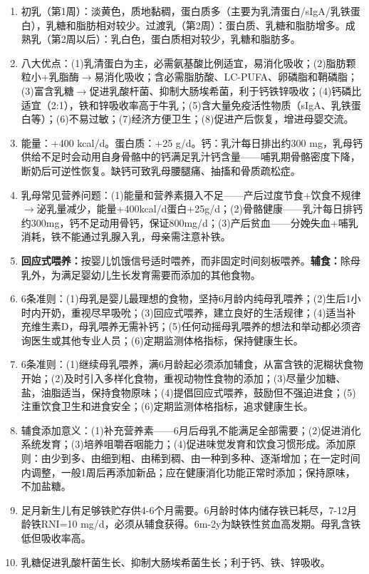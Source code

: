 {\begin{enumerate}[leftmargin=*, itemsep=5pt]
    \item 初乳（第1周）：淡黄色，质地黏稠，蛋白质多（主要为乳清蛋白/sIgA/乳铁蛋白），乳糖和脂肪相对较少。过渡乳（第2周）：蛋白质、乳糖和脂肪增多。成熟乳（第2周以后）：乳白色，蛋白质相对较少，乳糖和脂肪多。
    \item 八大优点：(1)乳清蛋白为主，必需氨基酸比例适宜，易消化吸收；(2)脂肪颗粒小+乳脂酶$\rightarrow$易消化吸收；含必需脂肪酸、LC-PUFA、卵磷脂和鞘磷脂；(3)富含乳糖$\rightarrow$促进乳酸杆菌、抑制大肠埃希菌，利于钙铁锌吸收；(4)钙磷比适宜（2:1），铁和锌吸收率高于牛乳；(5)含大量免疫活性物质（sIgA、乳铁蛋白等）；(6)不易过敏；(7)经济方便卫生；(8)促进产后恢复，增进母婴交流。
    \item 能量：+400 kcal/d。蛋白质：+25 g/d。钙：乳汁每日排出约300 mg，乳母钙供给不足时会动用自身骨骼中的钙满足乳汁钙含量——哺乳期骨骼密度下降，断奶后可逆性恢复。缺钙可致乳母腰腿痛、抽搐和骨质疏松症。
    \item 乳母常见营养问题：(1)能量和营养素摄入不足——产后过度节食+饮食不规律$\rightarrow$泌乳量减少，能量+400kcal/d蛋白+25g/d；(2)骨骼健康——乳汁每日排钙约300mg，钙不足动用骨钙，保证800mg/d；(3)产后贫血——分娩失血+哺乳消耗，铁不能通过乳腺入乳，母亲需注意补铁。
    \item \textbf{回应式喂养：}按婴儿饥饿信号适时喂养，而非固定时间刻板喂养。\textbf{辅食：}除母乳外，为满足婴幼儿生长发育需要而添加的其他食物。
    \item 6条准则：(1)母乳是婴儿最理想的食物，坚持6月龄内纯母乳喂养；(2)生后1小时内开奶，重视尽早吸吮；(3)回应式喂养，建立良好的生活规律；(4)适当补充维生素D，母乳喂养无需补钙；(5)任何动摇母乳喂养的想法和举动都必须咨询医生或其他专业人员；(6)定期监测体格指标，保持健康生长。
    \item 6条准则：(1)继续母乳喂养，满6月龄起必须添加辅食，从富含铁的泥糊状食物开始；(2)及时引入多样化食物，重视动物性食物的添加；(3)尽量少加糖、盐，油脂适当，保持食物原味；(4)提倡回应式喂养，鼓励但不强迫进食；(5)注重饮食卫生和进食安全；(6)定期监测体格指标，追求健康生长。
    \item 辅食添加意义：(1)补充营养素——6月后母乳不能满足全部需要；(2)促进消化系统发育；(3)培养咀嚼吞咽能力；(4)促进味觉发育和饮食习惯形成。添加原则：由少到多、由细到粗、由稀到稠、由一种到多种、逐渐增加；在一定时间内调整，一般1周后再添加新品；应在健康消化功能正常时添加；保持原味，不加盐糖。
    \item 足月新生儿有足够铁贮存供4-6个月需要。6月龄时体内储存铁已耗尽，7-12月龄铁RNI=10 mg/d，必须从辅食获得。6m-2y为缺铁性贫血高发期。母乳含铁低但吸收率高。
    \item 乳糖促进乳酸杆菌生长、抑制大肠埃希菌生长；利于钙、铁、锌吸收。

\end{enumerate}}
